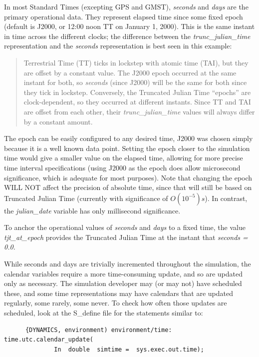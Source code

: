 In most Standard Times (excepting GPS and GMST), \textit{seconds} and
\textit{days} are the primary operational data.  They represent elapsed
time since some fixed epoch (default is J2000, or 12:00 noon TT on January 1,
2000). This is the same instant in time across the different clocks;
the difference between the \textit{trunc\_julian\_time} representation
and the \textit{seconds} representation is best seen in this example:
\begin{quotation}
Terrestrial Time (TT) ticks in lockstep with atomic time (TAI), but they
are offset by a constant value.  The J2000 epoch occurred at the same
instant for both, so \textit{seconds} (since J2000) will be the same
for both since they tick in lockstep.  Conversely, the Truncated Julian
Time {\textquotedblleft}epochs{\textquotedblright} are clock-dependent,
so they occurred at different instants.  Since TT and TAI are offset
from each other, their \textit{trunc\_julian\_time} values will always
differ by a constant amount.
\end{quotation}

The epoch can be easily configured to any desired time, J2000 was chosen simply
because it is a well known data point.
Setting the epoch closer to the simulation
time would give a smaller value on the elapsed time, allowing for more precise
time interval specifications (using J2000 as the epoch does allow microsecond
significance, which is adequate for most purposes).  Note that changing the
epoch WILL NOT affect the precision of absolute time, since that will still be
based on Truncated Julian Time (currently with significance of $O(10^{-5}) s$).
In contrast, the \textit{julian\_date} variable has only millisecond
significance.

To anchor the operational values of \textit{seconds }and \textit{days}
to a fixed time, the value \textit{tjt\_at\_epoch} provides the
Truncated Julian Time at the instant that \textit{seconds = 0.0.}

While seconds and days are trivially incremented throughout the
simulation, the calendar variables require a more time-consuming
update, and so are updated only as necessary.  The simulation developer
may (or may not) have scheduled these, and some time representations
may have calendars that are updated regularly, some rarely, some never.
 To check how often those updates are scheduled, look at the S\_define
file for the statements similar to:


\begin{verbatim}
      {DYNAMICS, environment) environment/time: time.utc.calendar_update(
              In  double  simtime =  sys.exec.out.time);
\end{verbatim}

